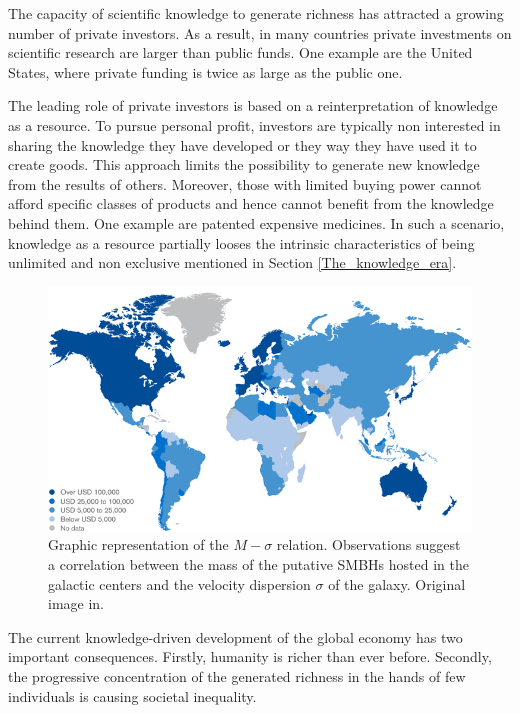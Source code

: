 The capacity of scientific knowledge to generate richness has attracted a growing number of private investors. As a result, in many countries private investments on scientific research are larger than public funds. One example are the United States, where private funding is twice as large as the public one. 

The leading role of private investors is based on a reinterpretation of knowledge as a resource. To pursue personal profit, investors are typically non interested in sharing the knowledge they have developed or they way they have used it to create goods. This approach limits the possibility to generate new knowledge from the results of others. Moreover, those with limited buying power cannot afford specific classes of products and hence cannot benefit from the knowledge behind them. One example are patented expensive medicines. In such a scenario, knowledge as a resource partially looses the intrinsic characteristics of being unlimited and non exclusive mentioned in Section \ref{The_knowledge_era}. 

\begin{figure}[!t] 
 \begin{center}
 \includegraphics[scale=0.3]{Images/World_wealth_levels.png}
 \caption{Graphic representation of the $M - \sigma$ relation. Observations suggest a correlation between the mass of the putative SMBHs hosted in the galactic centers and the velocity dispersion $\sigma$ of the galaxy. Original image in.}
 \label{M_sigma_relation}
 \end{center}
\end{figure}

The current knowledge-driven development of the global economy has two important consequences. Firstly, humanity is richer than ever before. Secondly, the progressive concentration of the generated richness in the hands of few individuals is causing societal inequality. 

